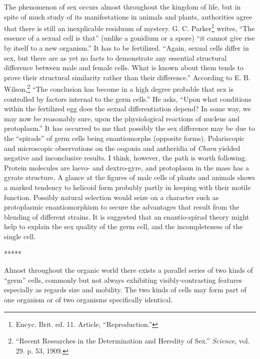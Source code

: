 \documentclass[a4paper, 12pt, oneside, landscape]{article}
\begin{document}
The phenomenon of sex occurs almost throughout the kingdom of life, but in spite of much study of its manifestations in animals and plants, authorities agree that there is still an inexplicable residuum of mystery. G. C. Parker\footnote{Encyc. Brit. ed. 11. Article, ``Reproduction.''} writes, ``The essence of a sexual cell is that'' (unlike a gonidium or a spore) ``it cannot give rise by itself to a new organism.'' It has to be fertilized. ``Again, sexual cells differ in sex, but there are as yet no facts to demonstrate any essential structural difference between male and female cells. What is known about them tends to prove their structural similarity rather than their difference.'' According to E. B. Wilson,\footnote{``Recent Researches in the Determination and Heredity of Sex.'' \emph{Science}, vol. 29. p. 53, 1909.} ``The conclusion has become in a high degree probable that sex is controlled by factors internal to the germ cells.'' He asks, ``Upon what conditions within the fertilized egg does the sexual differentiation depend? In some way, we may now be reasonably sure, upon the physiological reactions of nucleus and protoplasm.'' It has occurred to me that possibly the sex difference may be due to the ``spirads'' of germ cells being enantiomorphs (opposite forms). Polariscopic and microscopic observations on the oogonia and antheridia of \emph{Chara} yielded negative and inconclusive results. I think, however, the path is worth following. Protein molecules are laevo- and dextro-gyre, and protoplasm in the mass has a gyrate structure. A glance at the figures of male cells of plants and animals shows a marked tendency to helicoid form probably partly in keeping with their motile function. Possibly natural selection would seize on a character such as protoplasmic enantiomorphism to secure the advantages that result from the blending of different strains. It is suggested that an enantio-spirad theory might help to explain the sex quality of the germ cell, and the incompleteness of the single cell.

\centerline{*\hspace{15mm}*\hspace{15mm}*\hspace{15mm}*\hspace{15mm}*}
\bigskip

Almost throughout the organic world there exists a parallel series of two kinds of ``germ'' cells, commonly but not always exhibiting visibly-contrasting features especially as regards size and mobility. The two kinds of cells may form part of one organism or of two organisms specifically identical.
\end{document}

